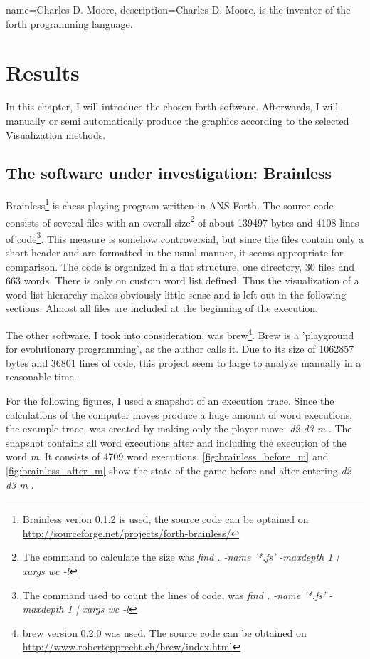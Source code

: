 {
  name={Charles D. Moore},
  description={Charles D. Moore, is the inventor of the forth programming language.}
}

\chapter{Results}
\label{chap:Results}

In this chapter, I will introduce the chosen forth software. Afterwards, I will manually or semi automatically produce the graphics according to the selected Visualization methods.

\section{The software under investigation: Brainless}

Brainless\footnote{Brainless verion 0.1.2 is used, the source code can be optained on \url{http://sourceforge.net/projects/forth-brainless/}} is chess-playing program written in ANS Forth. The source code consists of several files with an overall size\footnote{The command to calculate the size was \emph{find . -name '*.fs' -maxdepth 1 | xargs wc -l}} of about 139497 bytes and 4108 lines of code\footnote{The command used to count the lines of code, was \emph{find . -name '*.fs' -maxdepth 1 | xargs wc -l}}.
This measure is somehow controversial, but since the files contain only a short header and are formatted in the usual manner, it seems appropriate for comparison. The code is organized in a flat structure, one directory, 30 files and 663 words. There is only on custom word list defined. Thus the visualization of a word list hierarchy makes obviously little sense and is left out in the following sections. Almost all files are included at the beginning of the execution.

The other software, I took into consideration, was brew\footnote{brew version 0.2.0 was used. The source code can be obtained on \url{http://www.robertepprecht.ch/brew/index.html}}. Brew is a 'playground for evolutionary programming', as the author calls it. Due to its size of 1062857 bytes and 36801 lines of code, this project seem to large to analyze manually in a reasonable time.

For the following figures, I used a snapshot of an execution trace.
Since the calculations of the computer moves produce a huge amount of word executions, the example trace, was created by making only the player move: \emph{d2 d3 m} \keys{\return}. The snapshot contains all word executions after and including the execution of the word \emph{m}. It consists of 4709 word executions. \ref{fig:brainless_before_m} and \ref{fig:brainless_after_m} show the state of the game before and after entering \emph{d2 d3 m} \keys{\return}.

